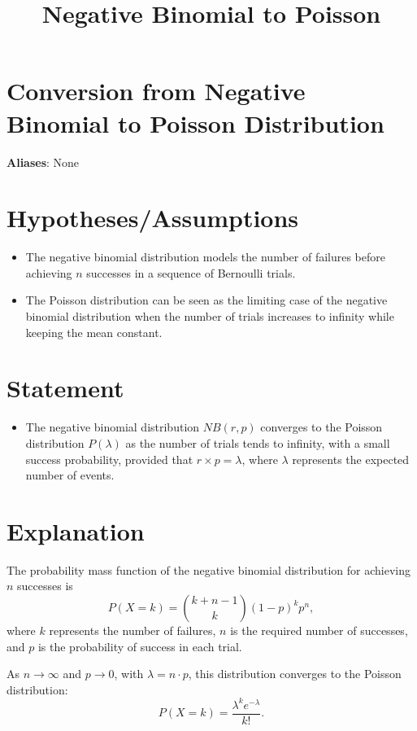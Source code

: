 \documentclass{article}
\title{Negative Binomial to Poisson}
\author{}
\date{}
\begin{document}
\maketitle

\section*{Conversion from Negative Binomial to Poisson Distribution}
\textbf{Aliases}: None

\section*{Hypotheses/Assumptions}
\begin{itemize}
    \item The negative binomial distribution models the number of failures before achieving \( n \) successes in a sequence of Bernoulli trials.
    \item The Poisson distribution can be seen as the limiting case of the negative binomial distribution when the number of trials increases to infinity while keeping the mean constant.
\end{itemize}

\section*{Statement}
\begin{itemize}
    \item The negative binomial distribution \( NB(r, p) \) converges to the Poisson distribution \( P(\lambda) \) as the number of trials tends to infinity, with a small success probability, provided that \( r \times p = \lambda \), where \( \lambda \) represents the expected number of events.
\end{itemize}

\section*{Explanation}
The probability mass function of the negative binomial distribution for achieving \( n \) successes is
\[
P(X = k) = \binom{k + n - 1}{k} (1 - p)^k p^n,
\]
where \( k \) represents the number of failures, \( n \) is the required number of successes, and \( p \) is the probability of success in each trial.

As \( n \to \infty \) and \( p \to 0 \), with \( \lambda = n \cdot p \), this distribution converges to the Poisson distribution:
\[
P(X = k) = \frac{\lambda^k e^{-\lambda}}{k!}.
\]
\end{document}

